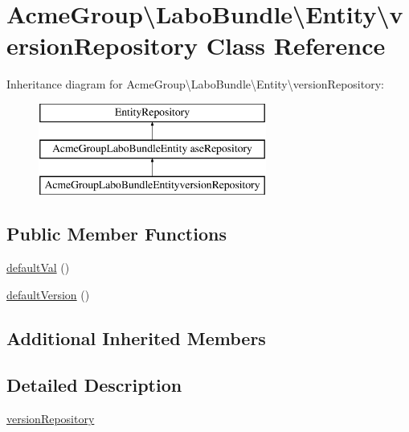 \hypertarget{class_acme_group_1_1_labo_bundle_1_1_entity_1_1version_repository}{\section{Acme\+Group\textbackslash{}Labo\+Bundle\textbackslash{}Entity\textbackslash{}version\+Repository Class Reference}
\label{class_acme_group_1_1_labo_bundle_1_1_entity_1_1version_repository}
}
Inheritance diagram for Acme\+Group\textbackslash{}Labo\+Bundle\textbackslash{}Entity\textbackslash{}version\+Repository\+:\begin{figure}[H]
\begin{center}
\leavevmode
\includegraphics[height=3.000000cm]{class_acme_group_1_1_labo_bundle_1_1_entity_1_1version_repository}
\end{center}
\end{figure}
\subsection*{Public Member Functions}
\begin{DoxyCompactItemize}
\item 
\hyperlink{class_acme_group_1_1_labo_bundle_1_1_entity_1_1version_repository_a9f5e0e2c7e7455a625e0d18b5e6616d3}{default\+Val} ()
\item 
\hyperlink{class_acme_group_1_1_labo_bundle_1_1_entity_1_1version_repository_a8955b6bdccaac186b23b1fe45506526b}{default\+Version} ()
\end{DoxyCompactItemize}
\subsection*{Additional Inherited Members}


\subsection{Detailed Description}
\hyperlink{class_acme_group_1_1_labo_bundle_1_1_entity_1_1version_repository}{version\+Repository}

